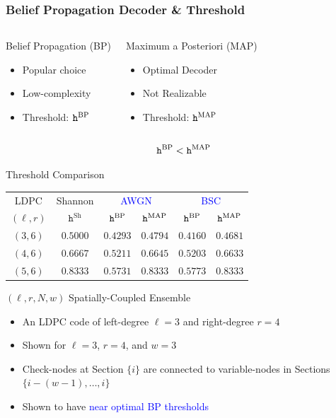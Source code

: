 \documentclass[10pt]{beamer}
\begin{document}
\begin{frame}\frametitle{Belief Propagation Decoder \& Threshold}
\hspace*{10pt}
\begin{columns}
\begin{defn}{Belief Propagation (BP)}
\begin{itemize}
\item Popular choice
\item Low-complexity
\item Threshold: $\texttt{h}^{\mathrm{BP}}$
\end{itemize}
\end{defn}
\begin{defn}{Maximum a Posteriori (MAP)}
\begin{itemize}
\item Optimal Decoder
\item \alert{Not Realizable}
\item Threshold: $\texttt{h}^{\mathrm{MAP}}$
\end{itemize}
\end{defn}
\end{columns}
{\Large \textcolor{blue}{
\begin{align*}
  \texttt{h}^{\mathrm{BP}} < \texttt{h}^{\mathrm{MAP}}
\end{align*}
}}
\end{frame}

\begin{frame}{Threshold Comparison}
\centering
\begin{tabular}{|c|c|c|c|c|c|}
  \hline
  LDPC & Shannon & \multicolumn{2}{|c|}{\textcolor{blue}{AWGN}} & \multicolumn{2}{|c|}{\textcolor{blue}{BSC}} \\
  \cline{3-6}
  $(\ell,r)$ & $\texttt{h}^{\mathrm{Sh}}$ & $\texttt{h}^{\mathrm{BP}}$ & $\texttt{h}^{\mathrm{MAP}}$ & $\texttt{h}^{\mathrm{BP}}$ & $\texttt{h}^{\mathrm{MAP}}$ \\
  \hline
  $(3,6)$ & $0.5000$ & $0.4293$ & $0.4794$ & $0.4160$ & $0.4681$ \\
  $(4,6)$ & $0.6667$ & $0.5211$ & $0.6645$ & $0.5203$ & $0.6633$ \\
  $(5,6)$ & $0.8333$ & $0.5731$ & $0.8333$ & $0.5773$ & $0.8333$ \\
  \hline
\end{tabular}
\end{frame}

\begin{frame}{$(\ell,r,N,w)$ Spatially-Coupled Ensemble}
  \scalebox{0.9}{}
  \begin{itemize}
  \item<1> An LDPC code of left-degree $\ell=3$ and right-degree $r=4$
  \item<3-> Shown for $\ell = 3$, $r = 4$, and $w=3$
  \item<3-> Check-nodes at Section $\{i\}$ are connected to variable-nodes in Sections $\{i-(w-1),\dots,i\}$
  \item<3-> Shown to have \textcolor{blue}{near optimal BP thresholds}
  \end{itemize}
\end{frame}
\end{document}

